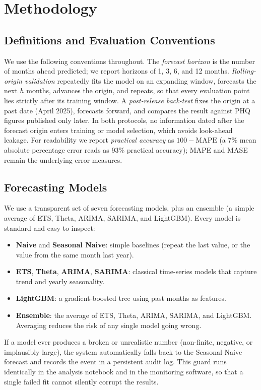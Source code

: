\documentclass[conference]{IEEEtran}
\begin{document}
\section{Methodology}
\subsection{Definitions and Evaluation Conventions}
\label{sec:terms}
We use the following conventions throughout. The \emph{forecast horizon} is the number of months
ahead predicted; we report horizons of 1, 3, 6, and 12 months. \emph{Rolling-origin validation}
repeatedly fits the model on an expanding window, forecasts the next $h$ months, advances the
origin, and repeats, so that every evaluation point lies strictly after its training window. A
\emph{post-release back-test} fixes the origin at a past date (April 2025), forecasts forward, and
compares the result against PHQ figures published only later. In both protocols, no information
dated after the forecast origin enters training or model selection, which avoids look-ahead
leakage. For readability we report \emph{practical accuracy} as $100-\mathrm{MAPE}$ (a 7\% mean
absolute percentage error reads as 93\% practical accuracy); MAPE and MASE remain the underlying
error measures.

\subsection{Forecasting Models}
We use a transparent set of seven forecasting models, plus an ensemble (a simple average of ETS,
Theta, ARIMA, SARIMA, and LightGBM). Every model is standard and easy to inspect:
\begin{itemize}
  \item \textbf{Naive} and \textbf{Seasonal Naive}: simple baselines (repeat the last value, or
        the value from the same month last year).
  \item \textbf{ETS}, \textbf{Theta}, \textbf{ARIMA}, \textbf{SARIMA}: classical time-series
        models that capture trend and yearly seasonality.
  \item \textbf{LightGBM}: a gradient-boosted tree using past months as features.
  \item \textbf{Ensemble}: the average of ETS, Theta, ARIMA, SARIMA, and LightGBM. Averaging
        reduces the risk of any single model going wrong.
\end{itemize}
If a model ever produces a broken or unrealistic number (non-finite, negative, or implausibly
large), the system automatically falls back to the Seasonal Naive forecast and records the event
in a persistent audit log. This guard runs identically in the analysis notebook and in the
monitoring software, so that a single failed fit cannot silently corrupt the results.
\end{document}
